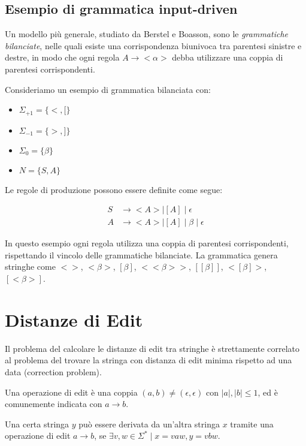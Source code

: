 \documentclass[a4paper,12pt]{report}
\theoremstyle{propositionstyle}
\begin{document}
    \subsection{Esempio di grammatica input-driven}
    
    Un modello più generale, studiato da Berstel e Boasson, sono le \textit{grammatiche bilanciate}, nelle quali esiste una corrispondenza biunivoca tra parentesi sinistre e destre, in modo che ogni regola $A \rightarrow <\alpha>$ debba utilizzare una coppia di parentesi corrispondenti.
    
    Consideriamo un esempio di grammatica bilanciata con:
    \begin{itemize}
        \item $\Sigma_{+1} = \{<, [\}$
        \item $\Sigma_{-1} = \{>, ]\}$
        \item $\Sigma_0 = \{\beta\}$
        \item $N = \{S, A\}$
    \end{itemize}
    
    Le regole di produzione possono essere definite come segue:
    
    \begin{align}
        S &\rightarrow < A > \mid [A] \mid \epsilon \\
        A &\rightarrow < A > \mid [A] \mid \beta \mid \epsilon
    \end{align}
    
    In questo esempio ogni regola utilizza una coppia di parentesi corrispondenti, rispettando il vincolo delle grammatiche bilanciate. La grammatica genera stringhe come $<>$, $<\beta>$, $[\beta]$, $<<\beta>>$, $[[\beta]]$, $<[\beta]>$, $[<\beta>]$.

    \section{Distanze di Edit}

    Il problema del calcolare le distanze di edit tra stringhe è strettamente correlato al problema del trovare la stringa con distanza di edit minima rispetto ad una data (correction problem).
    
    Una operazione di edit è una coppia $(a, b) \neq (\epsilon, \epsilon)$ con $|a|, |b| \leq 1$, ed è comunemente indicata con $a \rightarrow b$.

    Una certa stringa $y$ può essere derivata da un'altra stringa $x$ tramite una operazione di edit $a \rightarrow b$, se $\exists v, w \in \Sigma^* \mid x = vaw, y = vbw$.
    
\end{document}
